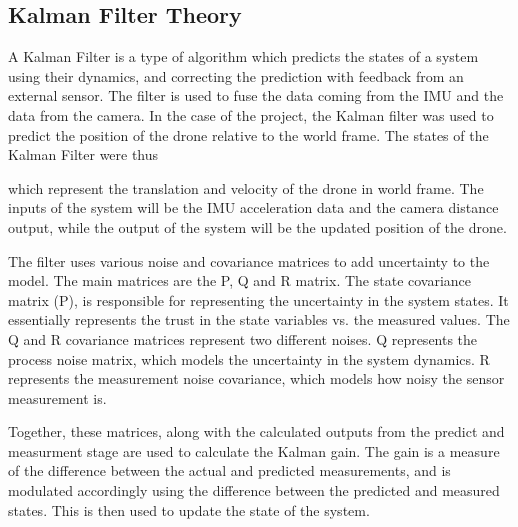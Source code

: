 \documentclass[introduction]{subfiles}
\begin{document}
\subsection{Kalman Filter Theory}
A Kalman Filter is a type of algorithm which predicts the states of a system using their dynamics, and correcting the prediction with feedback from an external sensor. The filter is used to fuse the data coming from the IMU and the data from the camera. 
In the case of the project, the Kalman filter was used to predict the position of the drone relative to the world frame. The states of the Kalman Filter were thus 

\begin{equation} 
    [ t_x, t_y, t_z, v_x, v_y, v_z ] 
\end{equation}  which represent the translation and velocity of the drone in world frame. 
The inputs of the system will be the IMU acceleration data and the camera distance output, while the output of the system will be the updated position of the drone.\newline

The filter uses various noise and covariance matrices to add uncertainty to the model. The main matrices are the P, Q and R matrix. The state covariance matrix (P), is responsible for representing the uncertainty in the system states. It essentially represents the trust in the state variables vs. the measured values.
The Q and R covariance matrices represent two different noises. Q represents the process noise matrix, which models the uncertainty in the system dynamics. R represents the measurement noise covariance, which models how noisy the sensor measurement is.\newline

Together, these matrices, along with the calculated outputs from the predict and measurment stage are used to calculate the Kalman gain. The gain is a measure of the difference between the actual and predicted measurements, and is modulated accordingly using the difference between the predicted and measured states. This is then used to update the state of the system. 
\end{document}
